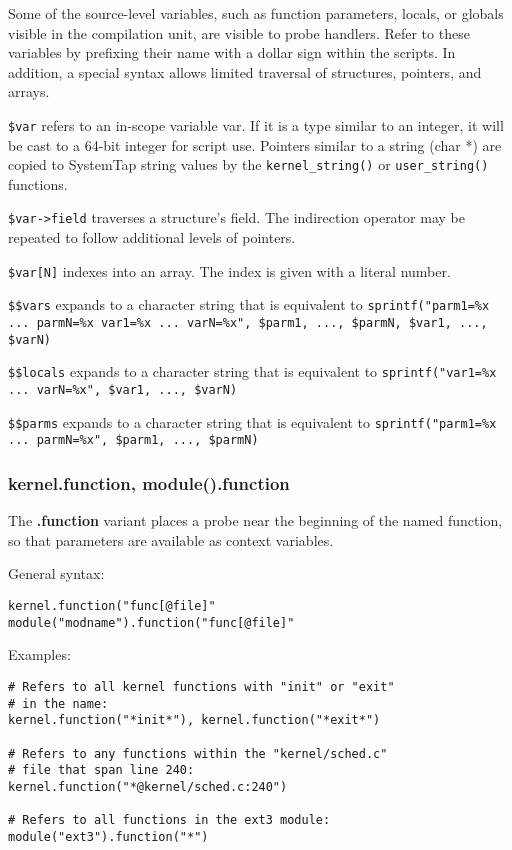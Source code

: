 \documentclass[twoside,english]{article}
\newenvironment{vindent}
{\begin{list}{}{\setlength{\listparindent}{6pt}}
\item[]}
{\end{list}}
\begin{document}
Some of the source-level variables, such as function parameters, locals,
or globals visible in the compilation unit, are visible to probe handlers.
Refer to these variables by prefixing their name with a dollar sign within
the scripts. In addition, a special syntax allows limited traversal of structures,
pointers, and arrays.

\texttt{\$var} refers to an in-scope variable var. If it is a type similar
to an integer, it will be cast to a 64-bit integer for script use. Pointers
similar to a string (char {*}) are copied to SystemTap string values by the
\texttt{kernel\_string()} or \texttt{user\_string()} functions.

\texttt{\$var->field} traverses a structure's field. The indirection operator
may be repeated to follow additional levels of pointers.

\texttt{\$var{[}N]} indexes into an array. The index is given with a literal
number.

\texttt{\$\$vars} expands to a character string that is equivalent to
\texttt{sprintf("parm1=\%x ... parmN=\%x var1=\%x ... varN=\%x", \$parm1, ..., \$parmN,
\$var1, ..., \$varN)}

\texttt{\$\$locals} expands to a character string that is equivalent to
\texttt{sprintf("var1=\%x ... varN=\%x", \$var1, ..., \$varN)}

\texttt{\$\$parms} expands to a character string that is equivalent to
\texttt{sprintf("parm1=\%x ... parmN=\%x", \$parm1, ..., \$parmN)}


\subsubsection{kernel.function, module().function}
The \textbf{.function} variant places a probe near the beginning of the named function,
so that parameters are available as context variables.

General syntax:

\begin{vindent}
\begin{verbatim}
kernel.function("func[@file]"
module("modname").function("func[@file]"
\end{verbatim}
\end{vindent}
Examples:

\begin{vindent}
\begin{verbatim}
# Refers to all kernel functions with "init" or "exit"
# in the name:
kernel.function("*init*"), kernel.function("*exit*")

# Refers to any functions within the "kernel/sched.c"
# file that span line 240:
kernel.function("*@kernel/sched.c:240")

# Refers to all functions in the ext3 module:
module("ext3").function("*")
\end{verbatim}
\end{vindent}
\end{document}
